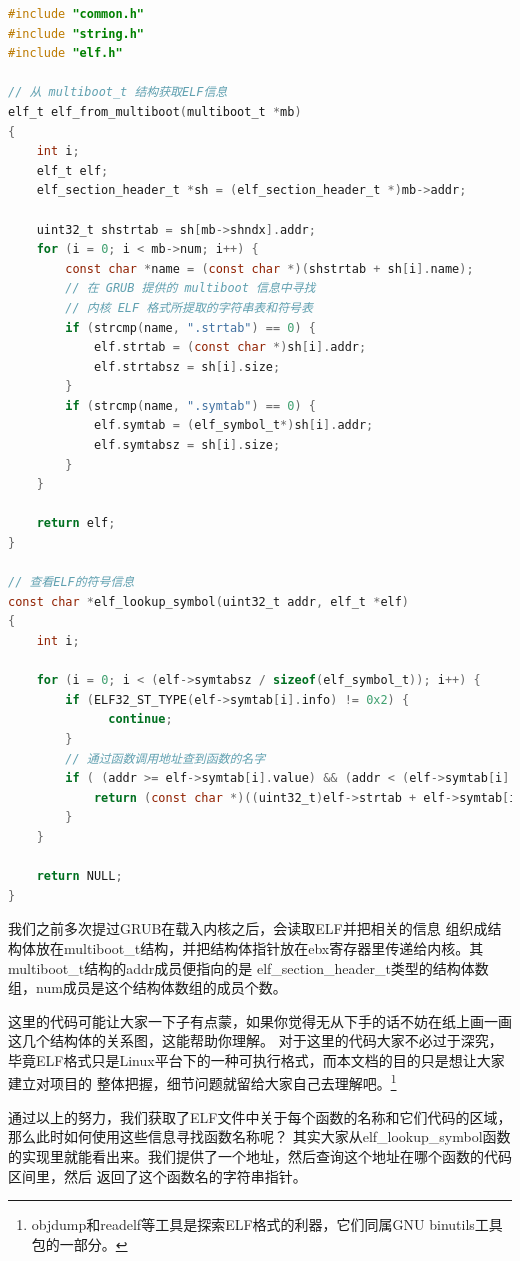 \begin{lstlisting}[language = C, caption = kernel/debug/elf.c]
#include "common.h"
#include "string.h"
#include "elf.h"

// 从 multiboot_t 结构获取ELF信息
elf_t elf_from_multiboot(multiboot_t *mb)
{
	int i;
	elf_t elf;
	elf_section_header_t *sh = (elf_section_header_t *)mb->addr;

	uint32_t shstrtab = sh[mb->shndx].addr;
	for (i = 0; i < mb->num; i++) {
		const char *name = (const char *)(shstrtab + sh[i].name);
		// 在 GRUB 提供的 multiboot 信息中寻找
		// 内核 ELF 格式所提取的字符串表和符号表
		if (strcmp(name, ".strtab") == 0) {
			elf.strtab = (const char *)sh[i].addr;
			elf.strtabsz = sh[i].size;
		}
		if (strcmp(name, ".symtab") == 0) {
			elf.symtab = (elf_symbol_t*)sh[i].addr;
			elf.symtabsz = sh[i].size;
		}
	}

	return elf;
}

// 查看ELF的符号信息
const char *elf_lookup_symbol(uint32_t addr, elf_t *elf)
{
	int i;

	for (i = 0; i < (elf->symtabsz / sizeof(elf_symbol_t)); i++) {
		if (ELF32_ST_TYPE(elf->symtab[i].info) != 0x2) {
		      continue;
		}
		// 通过函数调用地址查到函数的名字
		if ( (addr >= elf->symtab[i].value) && (addr < (elf->symtab[i].value + elf->symtab[i].size)) ) {
			return (const char *)((uint32_t)elf->strtab + elf->symtab[i].name);
		}
	}

	return NULL;
}
\end{lstlisting}

\par 我们之前多次提过GRUB在载入内核之后，会读取ELF并把相关的信息\allowbreak
组织成结构体放在multiboot\_t结构，并把结构体指针放在ebx寄存器里传递给内核。其multiboot\_t结构的addr成员便指向的是\allowbreak
elf\_section\_header\_t类型的结构体数组，num成员是这个结构体数组的成员个数。

\par 这里的代码可能让大家一下子有点蒙，如果你觉得无从下手的话不妨在纸上画一画这几个结构体的关系图，这能帮助你理解。\allowbreak
对于这里的代码大家不必过于深究，毕竟ELF格式只是Linux平台下的一种可执行格式，而本文档的目的只是想让大家建立对项目的\allowbreak
整体把握，细节问题就留给大家自己去理解吧。\footnote{objdump和readelf等工具是探索ELF格式的利器，它们同属GNU binutils工具包的一部分。}

\par 通过以上的努力，我们获取了ELF文件中关于每个函数的名称和它们代码的区域，那么此时如何使用这些信息寻找函数名称呢？\allowbreak
其实大家从elf\_lookup\_symbol函数的实现里就能看出来。我们提供了一个地址，然后查询这个地址在哪个函数的代码区间里，然后\allowbreak
返回了这个函数名的字符串指针。

